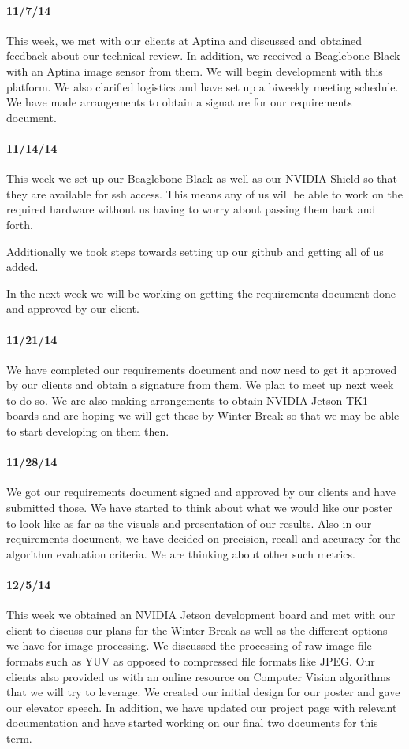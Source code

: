 \documentclass[letterpaper,10pt,titlepage]{article}
\begin{document}
    \paragraph*{11/7/14}
    This week, we met with our clients at Aptina and discussed and obtained 
    feedback about our technical review. In addition, we received a Beaglebone
    Black with an Aptina image sensor from them. We will begin development with
    this platform. We also clarified logistics and have set up a biweekly 
    meeting schedule. We have made arrangements to obtain a signature for our 
    requirements document. 
    \paragraph*{11/14/14}
    This week we set up our Beaglebone Black as well as our NVIDIA Shield so 
    that they are available for ssh access. This means any of us will be able 
    to work on the required hardware without us having to worry about passing
    them back and forth. 

    Additionally we took steps towards setting up our github and getting all of
    us added. 

    In the next week we will be working on getting the requirements document
    done and approved by our client.
    \paragraph*{11/21/14}
    We have completed our requirements document and now need to get it approved
    by our clients and obtain a signature from them. We plan to meet up next 
    week to do so. We are also making arrangements to obtain NVIDIA Jetson TK1 
    boards and are hoping we will get these by Winter Break so that we may be
    able to start developing on them then. 
    \paragraph*{11/28/14}
    We got our requirements document signed and approved by our clients and 
    have submitted those. We have started to think about what we would like our
    poster to look like as far as the visuals and presentation of our results.
    Also in our requirements document, we have decided on precision, recall and
    accuracy for the algorithm evaluation criteria. We are thinking about other
    such metrics.
    \paragraph*{12/5/14}
    This week we obtained an NVIDIA Jetson development board and met with our 
    client to discuss our plans for the Winter Break as well as the different
    options we have for image processing. We discussed the processing of raw 
    image file formats such as YUV as opposed to compressed file formats like 
    JPEG. Our clients also provided us with an online resource on Computer
    Vision algorithms that we will try to leverage. We created our initial 
    design for our poster and gave our elevator speech. In addition, we have 
    updated our project page with relevant documentation and have started 
    working on our final two documents for this term. 
\end{document}
